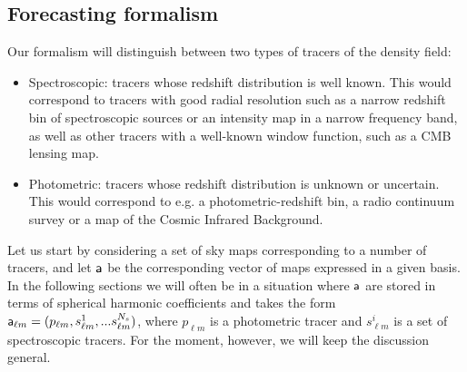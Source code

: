 \documentclass[prd,twocolumn]{revtex4}
\begin{document}
  \subsection{Forecasting formalism}\label{ssec:method.fisher}
    Our formalism will distinguish between two types of tracers of the density field:
    \begin{itemize}
      \item Spectroscopic: tracers whose redshift distribution is well known. This would
        correspond to tracers with good radial resolution such as a narrow redshift bin
        of spectroscopic sources or an intensity map in a narrow frequency band, as well
        as other tracers with a well-known window function, such as a CMB lensing map.
      \item Photometric: tracers whose redshift distribution is unknown or uncertain.
        This would correspond to e.g. a photometric-redshift bin, a radio continuum
        survey or a map of the Cosmic Infrared Background.
    \end{itemize}

    Let us start by considering a set of sky maps corresponding to a number of tracers,
    and let ${\sf a}$ be the corresponding vector of maps expressed in a given basis.
    In the following sections we will often be in a situation where ${\sf a}$ are
    stored in terms of spherical harmonic coefficients and takes the form
    ${\sf a}_{\ell m}=(p_{\ell m},s^1_{\ell m},...s^{N_s}_{\ell m})$,
    where $p_{\ell m}$ is a photometric tracer and $s^i_{\ell m}$ is a set of
    spectroscopic tracers. For the moment, however, we will keep the discussion general.
    
\end{document}

